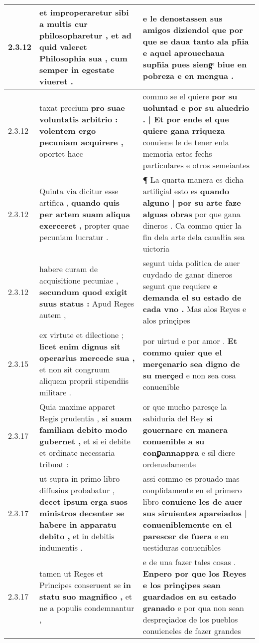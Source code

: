 \begin{tabular}{|p{1cm}|p{6.5cm}|p{6.5cm}|}
2.3.12 & et improperaretur sibi a multis cur philosopharetur , \textbf{ et ad quid valeret Philosophia sua , } cum semper in egestate viueret . & e le denostassen sus amigos \textbf{ diziendol que por que se daua tanto ala ph̃ia } e aquel aprouechaua suph̃ia pues siengͤ biue en pobreza e en mengua . \\\hline
2.3.12 & taxat precium \textbf{ pro suae voluntatis arbitrio : volentem ergo pecuniam acquirere , } oportet haec & commo se el quiere \textbf{ por su uoluntad e por su aluedrio . | Et por ende el que quiere gana rriqueza } conuiene le de tener enla memoria estos fechs particulares e otros semeiantes \\\hline
2.3.12 & Quinta via dicitur esse artifica , \textbf{ quando quis per artem suam aliqua exerceret , } propter quae pecuniam lucratur . & ¶ La quarta manera es dicha artifiçial esto es \textbf{ quando alguno | por su arte faze alguas obras } por que gana dineros . Ca commo quier la fin dela arte dela caualłia sea uictoria \\\hline
2.3.12 & habere curam de acquisitione pecuniae , \textbf{ secundum quod exigit suus status : } Apud Reges autem , & segunt uida politica de auer cuydado de ganar dineros segunt que requiere \textbf{ e demanda el su estado de cada vno . } Mas alos Reyes e alos prinçipes \\\hline
2.3.15 & ex virtute et dilectione ; \textbf{ licet enim dignus sit operarius mercede sua , } et non sit congruum aliquem proprii stipendiis militare . & por uirtud e por amor . \textbf{ Et commo quier que el merçenario sea digno de su merçed } e non sea cosa conuenible \\\hline
2.3.17 & Quia maxime apparet Regis prudentia , \textbf{ si suam familiam debito modo gubernet , } et si ei debite et ordinate necessaria tribuat : & or que mucho paresçe la sabiduria del Rey \textbf{ si gouernare en manera conuenible a su conꝑannappra } e sil diere ordenadamente \\\hline
2.3.17 & ut supra in primo libro diffusius probabatur , \textbf{ decet ipsum erga suos ministros decenter se habere in apparatu debito , } et in debitis indumentis . & assi commo es prouado mas conplidamente en el primero libro \textbf{ conuiene les de auer sus siruientes apareiados | conueniblemente en el parescer de fuera } e en uestiduras conuenibles \\\hline
2.3.17 & tamen ut Reges et Principes conseruent se \textbf{ in statu suo magnifico , } et ne a populis condemnantur , & e de una fazer tales cosas . \textbf{ Enpero por que los Reyes e los prinçipes sean guardados en su estado granado } e por qua non sean despreçiados de los pueblos conuieneles de fazer grandes \\\hline

\end{tabular}
